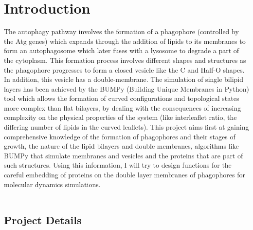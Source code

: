 \documentclass[12pt, a4paper]{report}
\begin{document}
\newpage 
\section*{Introduction}

The autophagy pathway involves the formation of a phagophore (controlled by the Atg genes) which expands through the addition of lipids to its membranes to form an autophagosome which later fuses with a lysosome to degrade a part of the cytoplasm. This formation process involves different shapes and structures as the phagophore progresses to form a closed vesicle like the C and Half-O shapes. In addition, this vesicle has a double-membrane. The simulation of single bilipid layers has been achieved by the BUMPy (Building Unique Membranes in Python) tool which allows the formation of curved configurations and topological states more complex than flat bilayers, by dealing with the consequences of increasing complexity on the physical properties of the system (like interleaflet ratio, the differing number of lipids in the curved leaflets). This project aims first at gaining comprehensive knowledge of the formation of phagophores and their stages of growth, the nature of the lipid bilayers and double membranes, algorithms like BUMPy that simulate membranes and vesicles and the proteins that are part of such structures. Using this information, I will try to design functions for the careful embedding of proteins on the double layer membranes of phagophores for molecular dynamics simulations. \\~\\


\subsection*{Project Details} 
\end{document}
